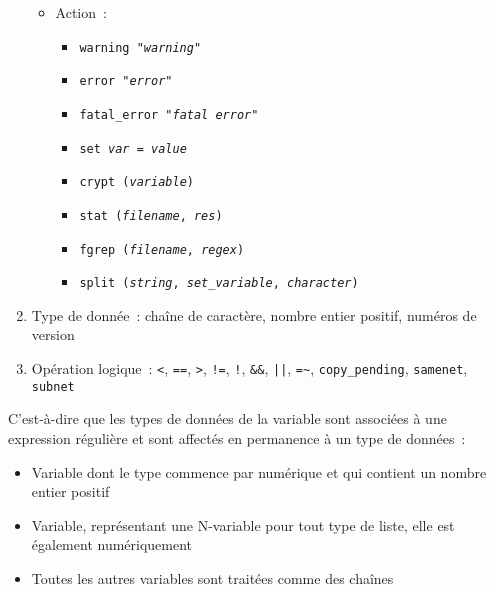 \begin{enumerate}
\begin{itemize}
      \item Action~:
        \begin{itemize}
        \item \texttt{warning "\textit{warning}"}
        \item \texttt{error   "\textit{error}"}
        \item \texttt{fatal\_error "\textit{fatal error}"}
        \item \texttt{set \textit{var} = \textit{value}}
        \item \texttt{crypt (\textit{variable})}
        \item \texttt{stat (\textit{filename}, \textit{res})}
        \item \texttt{fgrep (\textit{filename}, \textit{regex})}
        \item \texttt{split (\textit{string}, \textit{set\_variable}, \textit{character})}
        \end{itemize}
      \end{itemize}
    \item Type de donnée~:      chaîne de caractère, nombre entier positif, numéros de version
    \item Opération logique~:    \texttt{<}, \texttt{==}, \texttt{>}, \texttt{!=}, \texttt{!}, \texttt{\&\&}, \texttt{||},
       \texttt{=}\verb+~+, \texttt{copy\_pending}, \texttt{samenet}, \texttt{subnet}
    \end{enumerate}



    C'est-à-dire que les types de données de la variable sont associées à
	une expression régulière et sont affectés en permanence à un type de données~:

\begin{itemize}
\item Variable dont le type commence par \og{}\fg{} numérique et qui
contient un nombre entier positif
\item Variable, représentant une N-variable pour tout type de liste, elle est
également numériquement
\item Toutes les autres variables sont traitées comme des chaînes
\end{itemize}


